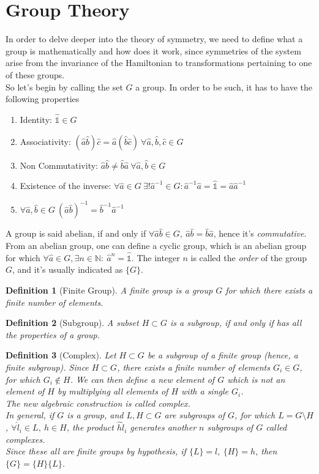 \documentclass[a4paper, 11pt]{book}
\newcommand{\1}{\opr{\mathds{1}}}
\newcommand{\opr}[1]{\hat{#1}}
\newcommand{\N}{\mathbb{N}}
\theoremstyle{plain}
\newtheorem{defn}{Definition}
\begin{document}
	\section{Group Theory}
	In order to delve deeper into the theory of symmetry, we need to define what a group is mathematically and how does it work, since symmetries of the system arise from the invariance of the Hamiltonian to transformations pertaining to one of these groups.\\
	So let's begin by calling the set $G$ a group. In order to be such, it has to have the following properties
	\begin{enumerate}
	\item Identity: $\1\in G$
	\item Associativity: $(\opr{a}\opr{b})\opr{c}=\opr{a}(\opr{b}\opr{c})\ \forall\opr{a},\opr{b},\opr{c}\in G$
	\item Non Commutativity: $\opr{a}\opr{b}\ne\opr{b}\opr{a}\ \forall\opr{a},\opr{b}\in G$
	\item Existence of the inverse: $\forall\opr{a}\in G\ \exists!\opr{a}^{-1}\in G:\opr{a}^{-1}\opr{a}=\1=\opr{a}\opr{a}^{-1}$
	\item $\forall\opr{a},\opr{b}\in G\ (\opr{a}\opr{b})^{-1}=\opr{b}^{-1}\opr{a}^{-1}$
	\end{enumerate}
	A group is said abelian, if and only if $\forall\opr{a}\opr{b}\in G,\ \opr{a}\opr{b}=\opr{b}\opr{a}$, hence it's \textit{commutative}.\\
	From an abelian group, one can define a cyclic group, which is an abelian group for which $\forall\opr{a}\in G,\exists n\in\N:\ \opr{a}^n=\1$. The integer $n$ is called the \textit{order} of the group $G$, and it's usually indicated as $\{G\}$.\\
	\begin{defn}[Finite Group]
		A finite group is a group $G$ for which there exists a finite number of elements.
	\end{defn}
	\begin{defn}[Subgroup]
		A subset $H\subset G$ is a subgroup, if and only if has all the properties of a group.
	\end{defn}
	\begin{defn}[Complex]
		Let $H\subset G$ be a subgroup of a finite group (hence, a finite subgroup). Since $H\subset G$, there exists a finite number of elements $G_i\in G$, for which $G_i\notin H$. We can then define a new element of $G$ which is not an element of $H$ by multiplying all elements of $H$ with a single $G_i$.\\
		The new algebraic construction is called \textit{complex}.\\
		In general, if $G$ is a group, and $L,H\subset G$ are subgroups of $G$, for which $L=G\setminus H$, $\forall \opr{l}_i\in L,\ \opr{h}\in H$, the product $\opr{h}\opr{l}_i$ generates another $n$ subgroups of $G$ called \textit{complexes}.\\
		Since these all are finite groups by hypothesis, if $\{L\}=l,\ \{H\}=h$, then $\{G\}=\{H\}\{L\}$.
	\end{defn}
\end{document}
